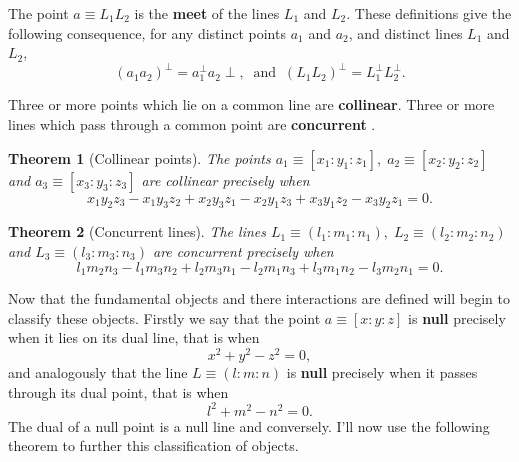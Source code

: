 \documentclass[11pt]{article}
\newtheorem{theorem}{Theorem}
\begin{document}
The point $a\equiv L_{1}L_{2}$ is the \textbf{meet} of the lines $L_{1}$ and 
$L_{2}$. These definitions give the following consequence, for any distinct
points $a_{1}$ and $a_{2}$, and distinct lines $L_{1}$ and $L_{2}$, 
\begin{equation*}
(a_{1}a_{2})^{\perp}=a_{1}^{\perp}a_{2}\perp,\;\;\text{and}%
\;\;(L_{1}L_{2})^{\perp}=L_{1}^{\perp}L_{2}^{\perp}.
\end{equation*}

Three or more points which lie on a common line are \textbf{collinear}.
Three or more lines which pass through a common point are \textbf{concurrent}%
.\newline

\begin{theorem}[Collinear points]
The points $a_{1}\equiv[x_{1}:y_{1}:z_{1}],\; a_{2}\equiv[x_{2}:y_{2}:z_{2}]$
and $a_{3}\equiv[x_{3}:y_{3}:z_{3}]$ are collinear precisely when 
\begin{equation*}
x_{1}y_{2}z_{3}-x_{1}y_{3}z_{2}+x_{2}y_{3}z_{1}-x_{2}y_{1}z_{3}+x_{3}y_{1}z_{2}-x_{3}y_{2}z_{1}=0.
\end{equation*}
\end{theorem}

\begin{theorem}[Concurrent lines]
The lines $L_{1}\equiv(l_{1}:m_{1}:n_{1}),\; L_{2}\equiv(l_{2}:m_{2}:n_{2})$
and $L_{3}\equiv(l_{3}:m_{3}:n_{3})$ are concurrent precisely when 
\begin{equation*}
l_{1}m_{2}n_{3}-l_{1}m_{3}n_{2}+l_{2}m_{3}n_{1}-l_{2}m_{1}n_{3}+l_{3}m_{1}n_{2}-l_{3}m_{2}n_{1}=0.
\end{equation*}
\end{theorem}

Now that the fundamental objects and there interactions are defined will
begin to classify these objects. Firstly we say that the point $a\equiv[x:y:z%
]$ is \textbf{null} precisely when it lies on its dual line, that is when 
\begin{equation*}
x^{2}+y^{2}-z^{2}=0,
\end{equation*}
and analogously that the line $L\equiv(l:m:n)$ is \textbf{null} precisely
when it passes through its dual point, that is when 
\begin{equation*}
l^{2}+m^{2}-n^{2}=0.
\end{equation*}
The dual of a null point is a null line and conversely. I'll now use the
following theorem to further this classification of objects.\newline
\end{document}

